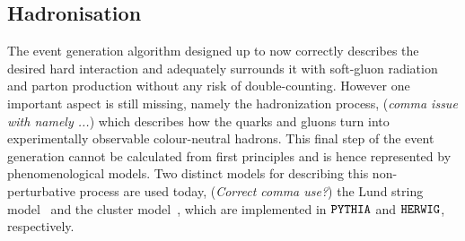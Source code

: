 
\subsection{Hadronisation} \label{sec::Hadronisation}
The event generation algorithm designed up to now correctly describes the desired hard interaction and adequately surrounds it with soft-gluon radiation and parton production without any risk of double-counting. However one important aspect is still missing, namely the hadronization process, (\textit{comma issue with namely ...}) which describes how the quarks and gluons turn into experimentally observable colour-neutral hadrons.
This final step of the event generation cannot be calculated from first principles and is hence represented by phenomenological models.
Two distinct models for describing this non-perturbative process are used today, (\textit{Correct comma use?}) the Lund string model~\cite{Lund} and the cluster model~\cite{ClusterModel}, which are implemented in $\texttt{PYTHIA}$ and $\texttt{HERWIG}$, respectively.

